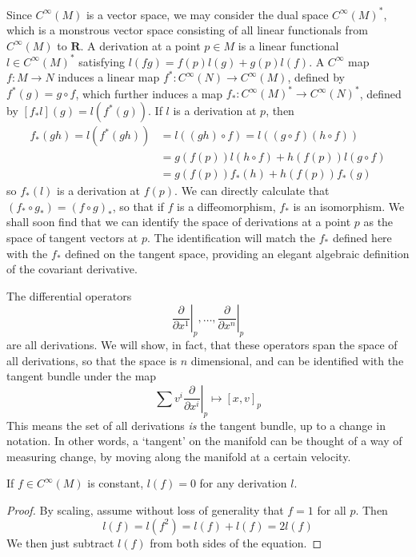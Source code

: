 Since $C^\infty(M)$ is a vector space, we may consider the dual space $C^\infty(M)^*$, which is a monstrous vector space consisting of all linear functionals from $C^\infty(M)$ to $\mathbf{R}$. A derivation at a point $p \in M$ is a linear functional $l \in C^\infty(M)^*$ satisfying $l(fg) = f(p) l(g) + g(p) l(f)$. A $C^\infty$ map $f: M \to N$ induces a linear map $f^*: C^\infty(N) \to C^\infty(M)$, defined by $f^*(g) = g \circ f$, which further induces a map $f_*: C^\infty(M)^* \to C^\infty(N)^*$, defined by $[f_*l](g) = l(f^*(g))$. If $l$ is a derivation at $p$, then
%
\begin{align*}
    f_*(gh) = l(f^*(gh)) &= l((gh) \circ f) = l((g \circ f)(h \circ f))\\
    &= g(f(p)) l(h \circ f) + h(f(p)) l(g \circ f)\\
    &= g(f(p)) f_*(h) + h(f(p)) f_*(g)
\end{align*}
%
so $f_*(l)$ is a derivation at $f(p)$. We can directly calculate that $(f_* \circ g_*) = (f \circ g)_*$, so that if $f$ is a diffeomorphism, $f_*$ is an isomorphism. We shall soon find that we can identify the space of derivations at a point $p$ as the space of tangent vectors at $p$. The identification will match the $f_*$ defined here with the $f_*$ defined on the tangent space, providing an elegant algebraic definition of the covariant derivative.

The differential operators
%
\[ \left. \frac{\partial}{\partial x^1} \right|_p, \dots, \left. \frac{\partial}{\partial x^n}\right|_p \]
%
are all derivations. We will show, in fact, that these operators span the space of all derivations, so that the space is $n$ dimensional, and can be identified with the tangent bundle under the map
%
\[ \left. \sum v^i \frac{\partial}{\partial x^i} \right|_p \mapsto [x,v]_p \]
%
This means the set of all derivations {\it is} the tangent bundle, up to a change in notation. In other words, a `tangent' on the manifold can be thought of a way of measuring change, by moving along the manifold at a certain velocity.

\begin{lemma}
    If $f \in C^\infty(M)$ is constant, $l(f) = 0$ for any derivation $l$.
\end{lemma}
\begin{proof}
    By scaling, assume without loss of generality that $f = 1$ for all $p$. Then
    \[ l(f) = l(f^2) = l(f) + l(f) = 2 l(f) \]
    We then just subtract $l(f)$ from both sides of the equation.
\end{proof}

